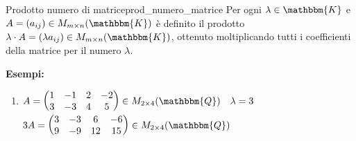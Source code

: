 \documentclass[12pt, letterpaper]{report}
\newcounter{definition}
\newcommand{\nmu}{}
\begin{document}
  		 \begin{definition}{\nmu Prodotto numero di matrice}{prod_numero_matrice}
  			Per ogni $\lambda \in \mathbbm{K}$ e $A = (a_{ij}) \in M_{m \times n}(\mathbbm{K})$ è definito il prodotto $\lambda \cdot A = (\lambda a_{ij}) \in M_{m \times n}(\mathbbm{K})$, ottenuto moltiplicando tutti i coefficienti della matrice per il numero $\lambda$.
  		\end{definition}
  		\textbf{Esempi:}
  		\begin{enumerate}
  			\item $A = \begin{pmatrix}
  				1 & -1 & 2 & -2 \\
  				3 & -3 & 4 & 5
  			\end{pmatrix} \in M_{2 \times 4}(\mathbbm{Q})\quad \lambda=3$ \\
  			$3A = \begin{pmatrix}
  				3 & -3 & 6 & -6 \\
  				9 & -9 & 12 & 15
  			\end{pmatrix} \in M_{2 \times 4}(\mathbbm{Q})$
  		\end{enumerate}
\end{document}
